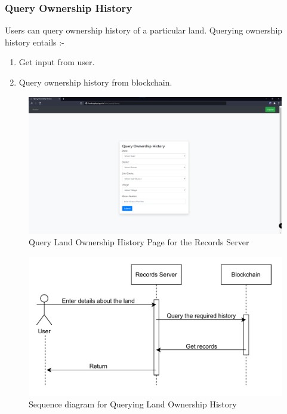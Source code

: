 \documentclass{article}
\begin{document}
        \subsubsection{Query Ownership History}
            Users can query ownership history of a particular land.
            Querying ownership history entails :-
            \begin{enumerate}
                \item Get input from user.
                \item Query ownership history from blockchain.
            \end{enumerate}
            
            \begin{figure}[htbp]
                \includegraphics[scale=0.25]{records_query_history}
                \centering
                \caption{Query Land Ownership History Page for the Records Server}
            \end{figure}
            
            \begin{figure}[htbp]
                \includegraphics[scale=0.25]{records_seq_query_history}
                \centering
                \caption{Sequence diagram for Querying Land Ownership History}
            \end{figure}
\end{document}
